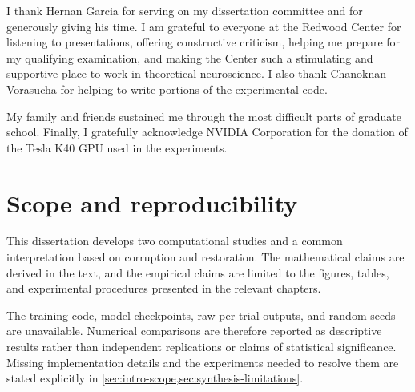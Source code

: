 \documentclass[11pt,oneside,openany]{book}
\begin{document}
I thank Hernan Garcia for serving on my dissertation committee and for generously giving his time. I am grateful to everyone at the Redwood Center for listening to presentations, offering constructive criticism, helping me prepare for my qualifying examination, and making the Center such a stimulating and supportive place to work in theoretical neuroscience. I also thank Chanoknan Vorasucha for helping to write portions of the experimental code.

My family and friends sustained me through the most difficult parts of graduate school. Finally, I gratefully acknowledge NVIDIA Corporation for the donation of the Tesla K40 GPU used in the experiments.

\chapter*{Scope and reproducibility}
This dissertation develops two computational studies and a common interpretation based on corruption and restoration. The mathematical claims are derived in the text, and the empirical claims are limited to the figures, tables, and experimental procedures presented in the relevant chapters.

The training code, model checkpoints, raw per-trial outputs, and random seeds are unavailable. Numerical comparisons are therefore reported as descriptive results rather than independent replications or claims of statistical significance. Missing implementation details and the experiments needed to resolve them are stated explicitly in \cref{sec:intro-scope,sec:synthesis-limitations}.

\mainmatter






\appendix


\backmatter


\end{document}
